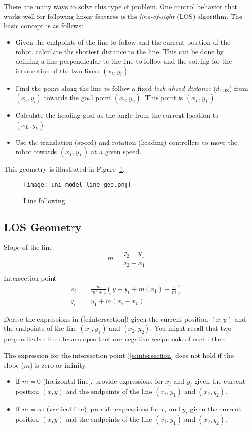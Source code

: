There are many ways to solve this type of problem.  One control behavior that works well for following linear features is the \emph{line-of-sight} (LOS) algorithm.  The basic concept is as follows:
\begin{itemize}
\item Given the endpoints of the line-to-follow and the current position of the robot, calculate the shortest distance to the line.  This can be done by defining a line perpendicular to the line-to-follow and the solving for the intersection of the two lines: $(x_i,y_i)$.
\item Find the point along the line-to-follow a fixed \emph{look ahead distance} ($d_{\mathrm{LOS}}$) from $(x_i,y_i)$ towards the goal point $(x_2,y_2)$.  This point is $(x_L,y_L)$.
\item Calculate the heading goal as the angle from the current location to $(x_L,y_L)$.
\item Use the translation (speed) and rotation (heading) controllers to move the robot towards $(x_L,y_L)$ at a given speed.
\end{itemize}
This geometry is illustrated in Figure~\ref{f:line_geo}.
\begin{figure}[hbt]
\centering
\texttt{[image: uni\_model\_line\_geo.png]}
\caption{Line following}
\label{f:line_geo}
\end{figure}

\subsection{LOS Geometry}

Slope of the line
\[
m = \frac{y_2-y_1}{x_2-x_1}
\]

Intersection point
\begin{align}\label{e:intersection}
x_i & = \frac{m}{m^2+1}\left(y-y_1+m(x_1)+\frac{x}{m}\right) \nonumber \\
y_i & = y_1+m(x_i-x_1) 
\end{align}

\begin{ex}
Derive the expressions in (\ref{e:intersection}) given the current position $(x,y)$ and the endpoints of the line $(x_1,y_1)$ and $(x_2,y_2)$.  You might recall that two perpendicular lines have slopes that are negative reciprocals of each other.
\end{ex}

\begin{ex}
The expression for the intersection point (\ref{e:intersection} does not hold if the slope ($m$) is zero or infinity.
\begin{itemize}
\item If $m=0$ (horizontal line), provide expressions for $x_i$ and $y_i$ given the current position $(x,y)$ and the endpoints of the line $(x_1,y_1)$ and $(x_2,y_2)$.
\item If $m=\infty$ (vertical line), provide expressions for $x_i$ and $y_i$ given the current position $(x,y)$ and the endpoints of the line $(x_1,y_1)$ and $(x_2,y_2)$.
\end{itemize}
\end{ex}



